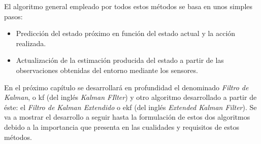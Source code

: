 \noindent
El algoritmo general empleado por todos estos métodos se basa en unos simples pasos:

\begin{itemize}

\item Predicción del estado próximo en función del estado actual y la acción realizada. \par 

\item Actualización de la estimación producida del estado a partir de las observaciones obtenidas del entorno mediante los sensores. \par 

\end{itemize}

En el próximo capítulo se desarrollará en profundidad el denominado \emph{Filtro de Kalman}, o \acrshort{kf} (del inglés \emph{Kalman FIlter}) y otro algoritmo desarrollado a partir de éste: el \emph{Filtro de Kalman Extendido} o \acrshort{ekf} (del inglés \emph{Extended Kalman Filter}). Se va a mostrar el desarrollo a seguir hasta la formulación de estos dos algoritmos debido a la importancia que presenta en las cualidades y requisitos de estos métodos. \par 